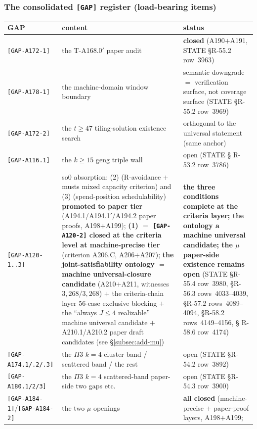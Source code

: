 \subsubsection{The consolidated \texttt{[GAP]} register (load-bearing
items)}\label{subsubsec:add-gapreg}

\small
\begin{longtable}{p{}p{}p{}}
\hline
GAP & content & status \\
\hline
\endhead
\hline
\endfoot
\texttt{[GAP-A172-1]} & the T-A168.0$'$ paper audit & \textbf{closed}
(A190$+$A191, STATE \S R-55.2 row~3963) \\
\texttt{[GAP-A178-1]} & the machine-domain window boundary & semantic
downgrade $=$ verification surface, not coverage surface (STATE \S R-55.2
row~3969) \\
\texttt{[GAP-A172-2]} & the $t\ge47$ tiling-solution existence search & orthogonal
to the universal statement (same anchor) \\
\texttt{[GAP-A116.1]} & the $k\ge15$ geng triple wall & open (STATE \S
R-53.2 row~3786) \\
\texttt{[GAP-A120-1..3]} & so0 absorption: (2) (R-avoidance $+$ musts mixed
capacity criterion) and (3) (spend-position schedulability)
\textbf{promoted to paper tier} (A194.1/A194.1$'$/A194.2 paper proofs,
A198$+$A199); \textbf{(1) $=$ \texttt{[GAP-A120-2]} closed at the criteria
level at machine-precise tier} (criterion A206.C, A206$+$A207); \textbf{the
joint-satisfiability ontology $=$ machine universal-closure candidate}
(A210$+$A211, witnesses $3{,}268/3{,}268$) $+$ the criteria-chain layer
$56$-case exclusive blocking $+$ the ``always $J\le4$ realizable'' machine
universal candidate $+$ A210.1/A210.2 paper draft candidates (see
\S\ref{subsec:add-mu}) & \textbf{the three conditions complete at the
criteria layer; the ontology a machine universal candidate; the $\mu$
paper-side existence remains open} (STATE \S R-55.4 row~3980, \S R-56.3
rows~4033--4039, \S R-57.2 rows~4089--4094, \S R-58.2 rows~4149--4156, \S
R-58.6 row~4174) \\
\texttt{[GAP-A174.1/.2/.3]} & the $\Pi$3 $k=4$ cluster band / scattered
band / the rest & open (STATE \S R-54.2 row~3892) \\
\texttt{[GAP-A180.1/2/3]} & the $\Pi$3 $k=4$ scattered-band paper-side two
gaps etc. & open (STATE \S R-54.3 row~3900) \\
\texttt{[GAP-A184-1]}/\texttt{[GAP-A184-2]} & the two $\mu$ openings &
\textbf{all closed} (machine-precise $+$ paper-proof layers, A198$+$A199;

\end{longtable}
